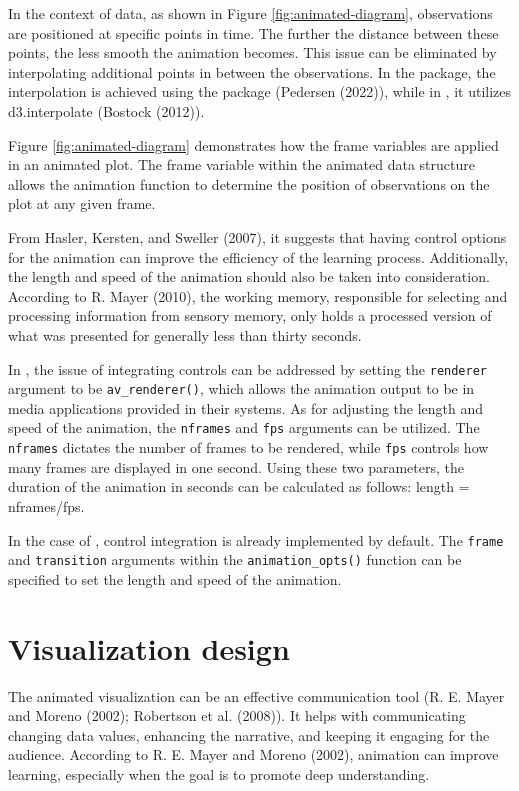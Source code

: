 In the context of data, as shown in Figure \ref{fig:animated-diagram}, observations are positioned at specific points in time. The further the distance between these points, the less smooth the animation becomes. This issue can be eliminated by interpolating additional points in between the observations. In the  package, the interpolation is achieved using the  package (Pedersen (2022)), while in , it utilizes d3.interpolate (Bostock (2012)).

Figure \ref{fig:animated-diagram} demonstrates how the frame variables are applied in an animated plot. The frame variable within the animated data structure allows the animation function to determine the position of observations on the plot at any given frame.

From Hasler, Kersten, and Sweller (2007), it suggests that having control options for the animation can improve the efficiency of the learning process. Additionally, the length and speed of the animation should also be taken into consideration. According to R. Mayer (2010), the working memory, responsible for selecting and processing information from sensory memory, only holds a processed version of what was presented for generally less than thirty seconds.

In , the issue of integrating controls can be addressed by setting the \texttt{renderer} argument to be \texttt{av\_renderer()}, which allows the animation output to be in media applications provided in their systems. As for adjusting the length and speed of the animation, the \texttt{nframes} and \texttt{fps} arguments can be utilized. The \texttt{nframes} dictates the number of frames to be rendered, while \texttt{fps} controls how many frames are displayed in one second. Using these two parameters, the duration of the animation in seconds can be calculated as follows: length = nframes/fps.

In the case of , control integration is already implemented by default. The \texttt{frame} and \texttt{transition} arguments within the \texttt{animation\_opts()} function can be specified to set the length and speed of the animation.

\hypertarget{design}{%
\section{Visualization design}\label{design}}

The animated visualization can be an effective communication tool (R. E. Mayer and Moreno (2002); Robertson et al. (2008)). It helps with communicating changing data values, enhancing the narrative, and keeping it engaging for the audience. According to R. E. Mayer and Moreno (2002), animation can improve learning, especially when the goal is to promote deep understanding.

